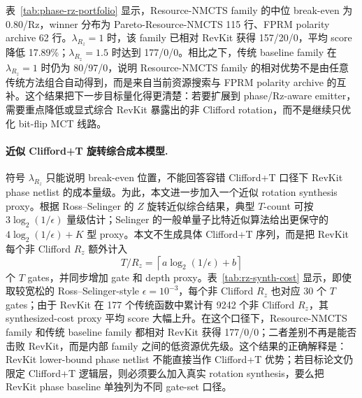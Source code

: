 \documentclass[UTF8,fontset=macnew,11pt]{ctexart}
\newcommand{\method}{Resource-NMCTS}
\begin{document}
表~\ref{tab:phase-rz-portfolio} 显示，Resource-NMCTS family 的中位 break-even 为 0.80/Rz，winner 分布为 Pareto-\method{} 115 行、FPRM polarity archive 62 行。$\lambda_{R_z}=1$ 时，该 family 已相对 RevKit 获得 157/20/0，平均 score 降低 17.89\%；$\lambda_{R_z}=1.5$ 时达到 177/0/0。相比之下，传统 baseline family 在 $\lambda_{R_z}=1$ 时仍为 80/97/0，说明 Resource-NMCTS family 的相对优势不是由任意传统方法组合自动得到，而是来自当前资源搜索与 FPRM polarity archive 的互补。这个结果把下一步目标量化得更清楚：若要扩展到 phase/Rz-aware emitter，需要重点降低或显式综合 RevKit 暴露出的非 Clifford rotation，而不是继续只优化 bit-flip MCT 线路。

\begin{table}[H]
\centering
\scriptsize
\caption{Phase/Rz 成本敏感性下的 score-reranked portfolio。$\lambda_{R_z}$ 表示每个 RevKit 非 Clifford $R_z$ 额外计入的 score 单位；Covered 为 break-even threshold 不超过当前 $\lambda_{R_z}$ 的函数数。}
\label{tab:phase-rz-portfolio}

\end{table}

\paragraph{近似 Clifford+T 旋转综合成本模型.}
符号 $\lambda_{R_z}$ 只能说明 break-even 位置，不能回答容错 Clifford+T 口径下 RevKit phase netlist 的成本量级。为此，本文进一步加入一个近似 rotation synthesis proxy。根据 Ross--Selinger 的 $Z$ 旋转近似综合结果，典型 $T$-count 可按 $3\log_2(1/\epsilon)$ 量级估计\cite{ross2014rz}；Selinger 的一般单量子比特近似算法给出更保守的 $4\log_2(1/\epsilon)+K$ 型 proxy\cite{selinger2015cliffordt}。本文不生成具体 Clifford+T 序列，而是把 RevKit 每个非 Clifford $R_z$ 额外计入
\[
T/R_z=\left\lceil a\log_2(1/\epsilon)+b\right\rceil
\]
个 $T$ gates，并同步增加 gate 和 depth proxy。表~\ref{tab:rz-synth-cost} 显示，即使取较宽松的 Ross--Selinger-style $\epsilon=10^{-3}$，每个非 Clifford $R_z$ 也对应 30 个 $T$ gates；由于 RevKit 在 177 个传统函数中累计有 9242 个非 Clifford $R_z$，其 synthesized-cost proxy 平均 score 大幅上升。在这个口径下，Resource-NMCTS family 和传统 baseline family 都相对 RevKit 获得 177/0/0；二者差别不再是能否击败 RevKit，而是内部 family 之间的低资源优先级。这个结果的正确解释是：RevKit lower-bound phase netlist 不能直接当作 Clifford+T 优势；若目标论文仍限定 Clifford+T 逻辑层，则必须要么加入真实 rotation synthesis，要么把 RevKit phase baseline 单独列为不同 gate-set 口径。

\begin{table}[H]
\centering
\scriptsize
\caption{近似 Clifford+T $R_z$ 综合成本模型下的 RevKit 对比。该表只使用 $T/R_z=\lceil a\log_2(1/\epsilon)+b\rceil$ 的逻辑层 proxy，不输出具体 Clifford+T 旋转序列，也不包含硬件 mapping。}
\label{tab:rz-synth-cost}

\end{table}
\end{document}
